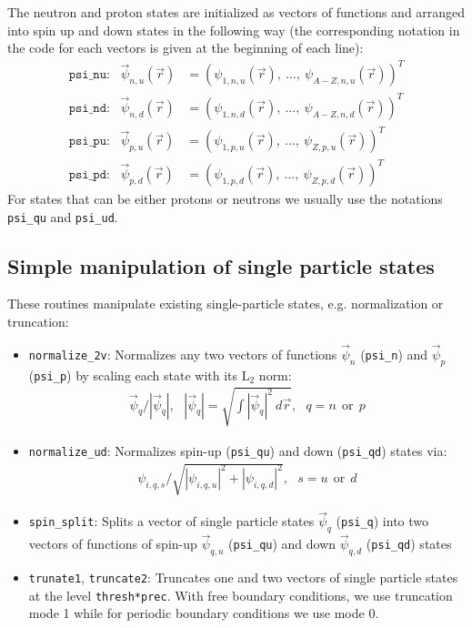 \documentclass[4p]{elsarticle}
\begin{document}
The neutron and proton states are initialized as vectors of functions and arranged into spin up and down states in the following way (the corresponding notation in the code for each vectors is given at the beginning of each line):
\begin{align}
 \texttt{psi\_nu}: \:\:\: \vec{\psi}_{n,u} (\vec{r}) &= \left( \psi_{1,n,u} (\vec{r}), \:  \dots,  \: \psi_{A-Z,n,u} (\vec{r}) \right)^T\\
 \texttt{psi\_nd}: \:\:\: \vec{\psi}_{n,d} (\vec{r}) &= \left( \psi_{1,n,d} (\vec{r}), \:  \dots,  \: \psi_{A-Z,n,d} (\vec{r}) \right)^T \\
\texttt{psi\_pu}: \:\:\: \vec{\psi}_{p,u} (\vec{r}) &= \left( \psi_{1,p,u} (\vec{r}), \:  \dots,  \: \psi_{Z,p,u} (\vec{r}) \right)^T \\
\texttt{psi\_pd}: \:\:\:  \vec{\psi}_{p,d} (\vec{r}) &= \left( \psi_{1,p,d} (\vec{r}), \:  \dots,  \: \psi_{Z,p,d} (\vec{r}) \right)^T 
\end{align}
For states that can be either protons or neutrons we usually use the notations \texttt{psi\_qu} and \texttt{psi\_ud}.   
\subsection{Simple manipulation of single particle states}
These routines manipulate existing single-particle states, e.g. normalization or truncation:
\begin{itemize}
\item \texttt{normalize\_2v}: Normalizes any two vectors of functions $\vec{\psi}_n$ (\texttt{psi\_n}) and $\vec{\psi}_p$ (\texttt{psi\_p}) by scaling each state with its L$_2$ norm:
\begin{align}
\vec{\psi}_{q} / | \vec{\psi}_q |, \: \: \: | \vec{\psi}_q | = \sqrt{\int | \vec{\psi}_q |^2 \: d \vec{r}}, \:\:\: q = n \:\:\mathrm{or} \:\:  p
\end{align}
\item \texttt{normalize\_ud}: Normalizes spin-up (\texttt{psi\_qu}) and down (\texttt{psi\_qd}) states via: 
\begin{align}
\psi_{i,q,s}  / \sqrt{ | \psi_{i,q,u} |^2 +  | \psi_{i,q,d} |^2 } , \: \: \: s = u \:\:\mathrm{or} \:\:  d
\end{align}
\item \texttt{spin\_split}: Splits a vector of single particle states $\vec{\psi}_q$ (\texttt{psi\_q}) into two vectors of functions of spin-up $\vec{\psi}_{q,u}$ (\texttt{psi\_qu}) and down $\vec{\psi}_{q,d}$ (\texttt{psi\_qd}) states 
\item \texttt{trunate1}, \texttt{truncate2}: Truncates one and two vectors of single particle states at the level \texttt{thresh*prec}. With free boundary conditions, we use truncation mode 1 while for periodic 
boundary conditions we use mode 0. 
\end{itemize}
\end{document}
